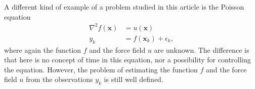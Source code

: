 \documentclass[journal]{IEEEtran}
\newcommand{\simo}[1]{{\color{red}#1}}
\begin{document}

A different kind of example of a problem studied in this article is the Poisson equation
%
\begin{equation}
\begin{split}
  \nabla^2 f(\mathbf{x}) &= u(\mathbf{x}) \\
  y_k &= f(\mathbf{x}_k) + \epsilon_k,
\end{split}
\label{eq:poisson0}
\end{equation}
%
where again the function $f$ and the force field $u$ are unknown. The difference is that here is no concept of time in this equation, nor a possibility for controlling the equation. However, the problem of estimating the function $f$ and the force field $u$ from the observations $y_k$ is still well defined.




\end{document}

